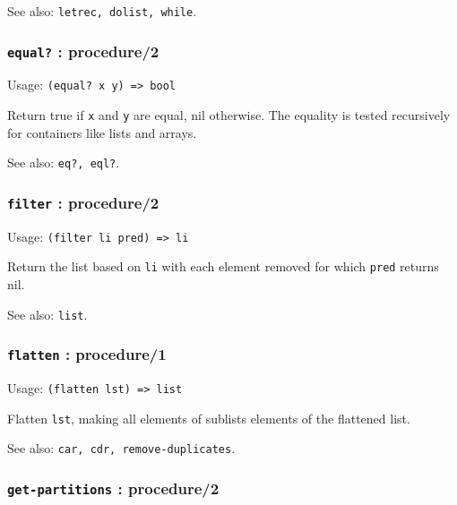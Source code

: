 \documentclass[
]{article}
\newcommand{\passthrough}[1]{#1}
\begin{document}
See also: \passthrough{\lstinline!letrec, dolist, while!}.

\hypertarget{equal-procedure2}{%
\subsubsection{\texorpdfstring{\texttt{equal?} :
procedure/2}{equal? : procedure/2}}\label{equal-procedure2}}

Usage: \passthrough{\lstinline!(equal? x y) => bool!}

Return true if \passthrough{\lstinline!x!} and
\passthrough{\lstinline!y!} are equal, nil otherwise. The equality is
tested recursively for containers like lists and arrays.

See also: \passthrough{\lstinline!eq?, eql?!}.

\hypertarget{filter-procedure2}{%
\subsubsection{\texorpdfstring{\texttt{filter} :
procedure/2}{filter : procedure/2}}\label{filter-procedure2}}

Usage: \passthrough{\lstinline!(filter li pred) => li!}

Return the list based on \passthrough{\lstinline!li!} with each element
removed for which \passthrough{\lstinline!pred!} returns nil.

See also: \passthrough{\lstinline!list!}.

\hypertarget{flatten-procedure1}{%
\subsubsection{\texorpdfstring{\texttt{flatten} :
procedure/1}{flatten : procedure/1}}\label{flatten-procedure1}}

Usage: \passthrough{\lstinline!(flatten lst) => list!}

Flatten \passthrough{\lstinline!lst!}, making all elements of sublists
elements of the flattened list.

See also: \passthrough{\lstinline!car, cdr, remove-duplicates!}.

\hypertarget{get-partitions-procedure2}{%
\subsubsection{\texorpdfstring{\texttt{get-partitions} :
procedure/2}{get-partitions : procedure/2}}\label{get-partitions-procedure2}}
\end{document}
